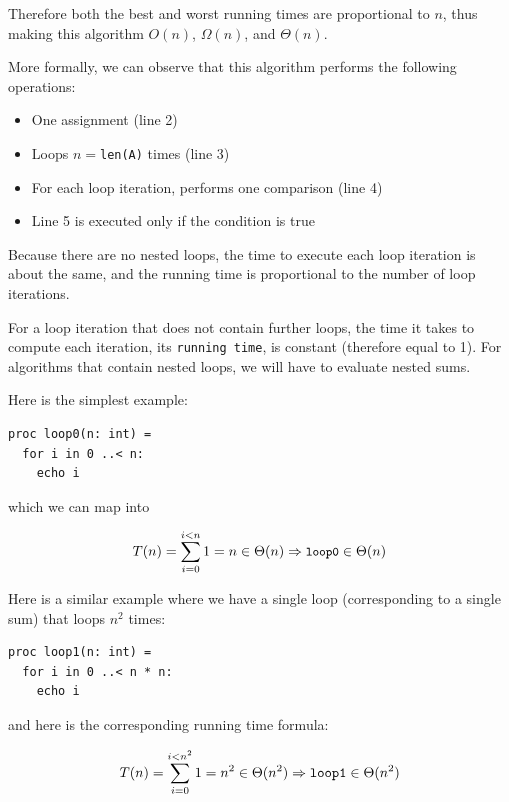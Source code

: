 \documentclass[justified, sixbynine]{tufte-book}
\def\ft{\small\tt}
\theoremstyle{plain}%
\newtheorem * {corollary}{Corollary}
\theoremstyle{definition}
\theoremstyle{remark}
\newtheorem * {remark}{Remark}
\newtheorem * {note}{Note}
\begin{document}
\begin{fullwidth}
Therefore both the best and worst running times are proportional to $n$, thus making this algorithm $O(n)$, $\Omega(n)$, and $\Theta(n)$.

More formally, we can observe that this algorithm performs the following operations:

\begin{itemize}
\item  One assignment (line 2)

\item  Loops $n=${\ft len(A)} times (line 3)

\item  For each loop iteration, performs one comparison (line 4)

\item  Line 5 is executed only if the condition is true
\end{itemize}

Because there are no nested loops, the time to execute each loop iteration is about the same, and the running time is proportional to the number of loop iterations.

For a loop iteration that does not contain further loops, the time it takes to compute each iteration, its {\ft running time}, is constant (therefore equal to 1). For algorithms that contain nested loops, we will have to evaluate nested sums.

Here is the simplest example:

\begin{lstlisting}
proc loop0(n: int) =
  for i in 0 ..< n:
    echo i
\end{lstlisting}

which we can map into

\begin{equation}
T(n)=\sum_{i=0}^{i<n}1=n\in \Theta (n)\Rightarrow \text{{\ft loop0}}\in
\Theta (n)
\end{equation}

Here is a similar example where we have a single loop (corresponding to a single sum) that loops $n^2$ times:

\begin{lstlisting}
proc loop1(n: int) =
  for i in 0 ..< n * n:
    echo i
\end{lstlisting}

and here is the corresponding running time formula:

\begin{equation}
T(n)=\sum_{i=0}^{i<n^2}1=n^2\in \Theta (n^2)\Rightarrow \text{{\tt loop1}}%
\in \Theta (n^2)
\end{equation}


\end{fullwidth}
\end{document}

